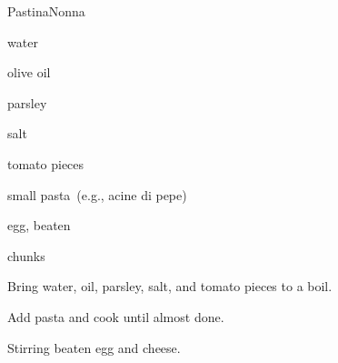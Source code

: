 \begin{recipe}{Pastina}{Nonna}{}

\begin{ingredients}
\item water
\item olive oil
\item parsley
\item salt
\item tomato pieces
\item small pasta~(e.g., acine di pepe)
\item egg, beaten
\item {} chunks
\end{ingredients}

\begin{directions}
\item Bring water, oil, parsley, salt, and tomato pieces to a boil.
\item Add pasta and cook until almost done.
\item Stirring beaten egg and cheese.
\end{directions}

\end{recipe}
